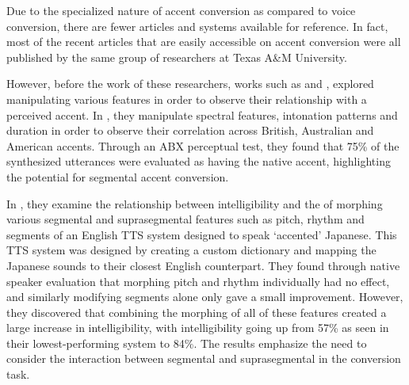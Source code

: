 \documentclass
[
    a4paper,
    twoside,
    12pt,
]
{report}
\begin{document}
Due to the specialized nature of accent conversion as compared to voice
conversion, there are fewer articles and systems available for
reference. In fact, most of the recent articles that are easily
accessible on accent conversion were all published by the same group of
researchers at Texas A\&M University.

However, before the work of these researchers, works such as
\textcite{yan2004} and \textcite{huckvale2007}, explored manipulating
various features in order to observe their relationship with a perceived
accent. In \textcite{yan2004}, they manipulate spectral features,
intonation patterns and duration in order to observe their correlation
across British, Australian and American accents. Through an ABX
perceptual test, they found that 75\% of the synthesized utterances were
evaluated as having the native accent, highlighting the potential for
segmental accent conversion.

In \textcite{huckvale2007}, they examine the relationship between
intelligibility and the of morphing various segmental and suprasegmental
features such as pitch, rhythm and segments of an English TTS system
designed to speak `accented' Japanese. This TTS system was designed by
creating a custom dictionary and mapping the Japanese sounds to their
closest English counterpart. They found through native speaker
evaluation that morphing pitch and rhythm individually had no effect,
and similarly modifying segments alone only gave a small improvement.
However, they discovered that combining the morphing of all of these
features created a large increase in intelligibility, with
intelligibility going up from 57\% as seen in their lowest-performing
system to 84\%. The results emphasize the need to consider the
interaction between segmental and suprasegmental in the conversion task.
\end{document}
